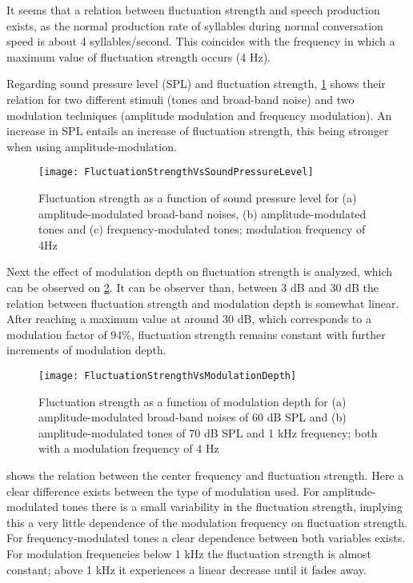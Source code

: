 \documentclass%
  [/Users/rodrigo/Documents/TUe/thesis/latex/topic/fluctuation_strength/
  literature_review.tex]
  {subfiles}
\begin{document}
It seems that a relation between fluctuation strength and speech production
exists, as the normal production rate of syllables during normal conversation
speed is about 4 syllables/second. This coincides with the frequency in which a
maximum value of fluctuation strength occurs (4 Hz).

Regarding sound pressure level (SPL) and fluctuation strength,
\cref{fig:flucstrenvsndpreslvl} shows their relation for two different stimuli
(tones and broad-band noise) and two modulation techniques (amplitude modulation
and frequency modulation). An increase in SPL entails an increase of fluctuation
strength, this being stronger when using amplitude-modulation.

\begin{figure}
  \centering
  \texttt{[image: FluctuationStrengthVsSoundPressureLevel]}
  \caption{Fluctuation strength as a function of sound pressure level for (a)
    amplitude-modulated broad-band noises, (b) amplitude-modulated tones and (c)
    frequency-modulated tones; modulation frequency of
    4Hz~\cite[pp.~249]{Fastl2007Psychoacoustics}}
\label{fig:flucstrenvsndpreslvl}
\end{figure}

Next the effect of modulation depth on fluctuation strength is analyzed, which
can be observed on \cref{fig:flucstrenvsmoddep}. It can be observer than,
between 3 dB and 30 dB the relation between fluctuation strength and modulation
depth is somewhat linear. After reaching a maximum value at around 30 dB, which
corresponds to a modulation factor of 94\%, fluctuation strength remains
constant with further increments of modulation depth.

\begin{figure}
  \centering
  \texttt{[image: FluctuationStrengthVsModulationDepth]}
  \caption{Fluctuation strength as a function of modulation depth for (a)
    amplitude-modulated broad-band noises of 60 dB SPL and (b)
    amplitude-modulated tones of 70 dB SPL and 1 kHz frequency; both with a
    modulation frequency of 4 Hz~\cite[pp.~249]{Fastl2007Psychoacoustics}}
\label{fig:flucstrenvsmoddep}
\end{figure}

 shows the relation between the center
frequency and fluctuation strength. Here a clear difference exists between the
type of modulation used. For amplitude-modulated tones there is a small
variability in the fluctuation strength, implying this a very little dependence
of the modulation frequency on fluctuation strength. For frequency-modulated
tones a clear dependence between both variables exists. For modulation
frequencies below 1 kHz the fluctuation strength is almost constant; above 1 kHz
it experiences a linear decrease until it fades away.
\end{document}
